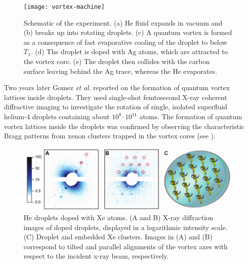 	\begin{figure}[t]
		\begin{center}
			\texttt{[image: vortex-machine]}
			\caption{Schematic of the experiment. (a) He fluid expands in vacuum and (b) breaks up into rotating droplets. (c) A quantum vortex is formed as a consequence of fast evaporative cooling of the droplet to below $T_\lambda$. (d) The droplet is doped with Ag atoms, which are attracted to the vortex core. (e) The droplet then collides with the carbon surface leaving behind the Ag trace, whereas the He evaporates.}
			\label{fig:vortex-machine}
		\end{center}
	\end{figure}	
	
	Two years later Gomez \emph{et al}. reported\citep{Gom14} on the formation of quantum vortex lattices inside droplets. They used single-shot femtosecond X-ray coherent diffractive imaging to investigate the rotation of single, isolated superfluid helium-4 droplets containing about $10^8$--$10^{11}$ atoms. The formation of quantum vortex lattices inside the droplets was confirmed by observing the characteristic Bragg patterns from xenon clusters trapped in the vortex cores (see ).

	\begin{figure}[t]
		\begin{center}
			\includegraphics[width=\textwidth]{vortex-array}
			\caption{He droplets doped with Xe atoms. (A and B) X-ray diffraction images of doped droplets, displayed in a logarithmic intensity scale. (C) Droplet and embedded Xe clusters. Images in (A) and (B) correspond to tilted and parallel alignments of the vortex axes with respect to the incident x-ray beam, respectively.}
			\label{fig:vortex-array}
		\end{center}
	\end{figure}
	
